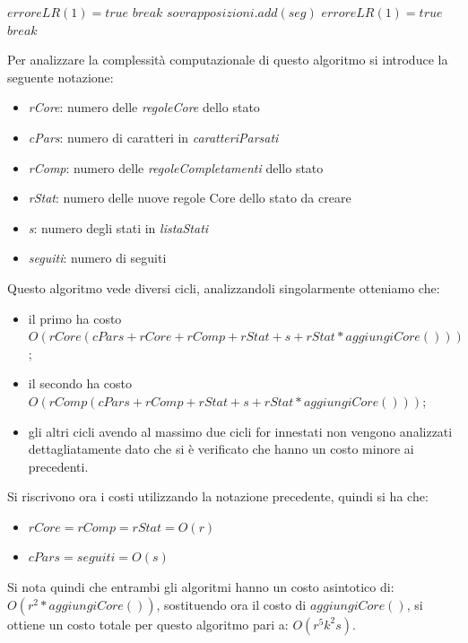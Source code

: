 \documentclass[12pt]{article}
\begin{document}
\begin{algorithm}[H]
\begin{algorithmic}
\State $erroreLR(1) = true$
\State $break$
\Else
\State $sovrapposizioni.add(seg)$
\EndIf
\EndFor
\EndIf
\EndFor
{}
\State $erroreLR(1) = true$
\State $break$
\EndIf
\EndFor
\end{algorithmic}
\end{algorithm}
Per analizzare la complessità computazionale di questo algoritmo si introduce la seguente notazione:
\begin{itemize}
\item \textit{rCore}: numero delle \textit{regoleCore} dello stato
\item \textit{cPars}: numero di caratteri in \textit{caratteriParsati}
\item \textit{rComp}: numero delle \textit{regoleCompletamenti} dello stato
\item \textit{rStat}: numero delle nuove regole Core dello stato da creare
\item \textit{s}: numero degli stati in \textit{listaStati}
\item \textit{seguiti}: numero di seguiti
\end{itemize}
Questo algoritmo vede diversi cicli, analizzandoli singolarmente otteniamo che:
\begin{itemize}
\item il primo ha costo $O(rCore(cPars+rCore+rComp+rStat+s+rStat*aggiungiCore()))$;
\item il secondo ha costo $O(rComp(cPars + rComp+ rStat+ s + rStat*aggiungiCore()))$;
\item gli altri cicli avendo al massimo due cicli for innestati non vengono analizzati dettagliatamente dato che si è verificato che hanno un costo minore ai precedenti.
\end{itemize}
Si riscrivono ora i costi utilizzando la notazione precedente, quindi si ha che:
\begin{itemize}
\item $rCore = rComp = rStat = O(r)$
\item $cPars = seguiti = O(s)$
\end{itemize}
Si nota quindi che entrambi gli algoritmi hanno un costo asintotico di: $O(r^2*aggiungiCore())$, sostituendo ora il costo di $aggiungiCore()$, si ottiene un costo totale per questo algoritmo pari a: $O(r^5 k^2 s)$.
\end{document}
